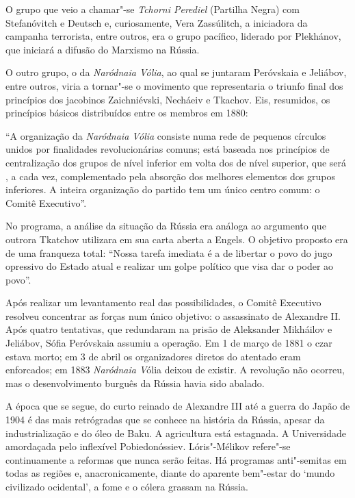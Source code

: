 O grupo que veio a chamar"-se \emph{Tchorni Perediel} (Partilha Negra)
com Stefanóvitch e Deutsch e, curiosamente, Vera Zassúlitch, a
iniciadora da campanha terrorista, entre outros, era o grupo pacífico,
liderado por Plekhánov, que iniciará a difusão do Marxismo na Rússia.

O outro grupo, o da \emph{Naródnaia Vólia}, ao qual se juntaram
Peróvskaia e Jeliábov, entre outros, viria a tornar"-se o movimento que
representaria o triunfo final dos princípios dos jacobinos Zaichniévski,
Necháeiv e Tkachov. Eis, resumidos, os princípios básicos distribuídos
entre os membros em 1880:

``A organização da \emph{Naródnaia Vólia} consiste numa rede de pequenos
círculos unidos por finalidades revolucionárias comuns; está baseada nos
princípios de centralização dos grupos de nível inferior em volta dos de
nível superior, que será , a cada vez, complementado pela absorção dos
melhores elementos dos grupos inferiores. A inteira organização do
partido tem um único centro comum: o Comitê Executivo''.

No programa, a análise da situação da Rússia era análoga ao argumento
que outrora Tkatchov utilizara em sua carta aberta a Engels. O objetivo
proposto era de uma franqueza total: ``Nossa tarefa imediata é a de
libertar o povo do jugo opressivo do Estado atual e realizar um golpe
político que visa dar o poder ao povo''.

Após realizar um levantamento real das possibilidades, o Comitê
Executivo resolveu concentrar as forças num único objetivo: o
assassinato de Alexandre II. Após quatro tentativas, que redundaram na
prisão de Aleksander Mikháilov e Jeliábov, Sófia Peróvskaia assumiu a
operação. Em 1 de março de 1881 o czar estava morto; em 3 de abril os
organizadores diretos do atentado eram enforcados; em 1883
\emph{Naródnaia V}ólia deixou de existir. A revolução não ocorreu, mas o
desenvolvimento burguês da Rússia havia sido abalado.

A época que se segue, do curto reinado de Alexandre III até a guerra do
Japão de 1904 é das mais retrógradas que se conhece na história da
Rússia, apesar da industrialização e do óleo de Baku. A agricultura está
estagnada. A Universidade amordaçada pelo inflexível Pobiedonóssiev.
Lóris"-Mélikov refere"-se continuamente a reformas que nunca serão feitas.
Há programas anti"-semitas em todas as regiões e, anacronicamente, diante
do aparente bem"-estar do `mundo civilizado ocidental', a fome e o cólera
grassam na Rússia.

